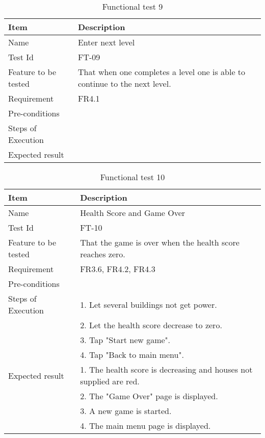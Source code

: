 \begin{table}[H]
\centering
	\begin{tabular}{ l | p{8cm} }
		\hline
		{\bf Item} & {\bf Description} \\ \hline
		Name & Enter next level \\ 
		Test Id & FT-09 \\ 
		Feature to be tested & That when one completes a level one is able to continue to the next level. \\ 
		Requirement & FR4.1 \\ 
		Pre-conditions & \\ 
		Steps of Execution & \\ 
		Expected result & \\ 
	\end{tabular}
	\caption{Functional test 9}
\end{table}

\begin{table}[H]
\centering
	\begin{tabular}{ l | p{8cm} }
		\hline
		{\bf Item} & {\bf Description} \\ \hline
		Name & Health Score and Game Over \\ 
		Test Id & FT-10 \\ 
		Feature to be tested & That the game is over when the health score reaches zero. \\ 
		Requirement & FR3.6, FR4.2, FR4.3 \\ 
		Pre-conditions & \\ 
		Steps of Execution & 1. Let several buildings not get power. \\ 
		& 2. Let the health score decrease to zero. \\
		& 3. Tap "Start new game". \\
		& 4. Tap "Back to main menu". \\
		Expected result & 1. The health score is decreasing and houses not supplied are red. \\
		& 2. The "Game Over" page is displayed. \\
		& 3. A new game is started. \\
		& 4. The main menu page is displayed. \\
	\end{tabular}
	\caption{Functional test 10}
\end{table}

